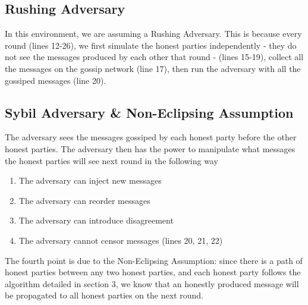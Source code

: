 \subsection{Rushing Adversary}
In this environment, we are assuming a Rushing Adversary. This is because every round (lines 12-26), we first simulate the honest parties independently - they do not see the messages produced by each other that round - (lines 15-19), collect all the messages on the gossip network (line 17), then run the adversary with all the gossiped messages (line 20).

\subsection{Sybil Adversary \& Non-Eclipsing Assumption}
The adversary sees the messages gossiped by each honest party before the other honest parties. The adversary then has the power to manipulate what messages the honest parties will see next round in the following way

\begin{enumerate}
    \item The adversary can inject new messages
    \item The adversary can reorder messages
    \item The adversary can introduce disagreement
    \item The adversary cannot censor messages (lines 20, 21, 22)
\end{enumerate}
The fourth point is due to the Non-Eclipsing Assumption: since there is a path of honest parties between any two honest parties, and each honest party follows the algorithm detailed in section 3, we know that an honestly produced message will be propagated to all honest parties on the next round.

